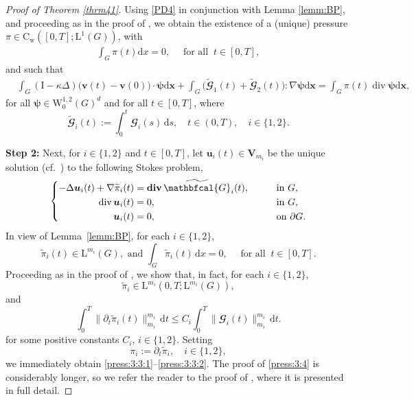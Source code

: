 \documentclass[12pt,reqno]{amsart}
\numberwithin{equation}{section}
\let\originalleft\left
\let\originalright\right
\renewcommand{\left}{\mathopen{}\mathclose\bgroup\originalleft}
\renewcommand{\right}{\aftergroup\egroup\originalright}
\theoremstyle{definition}
\def\d{\mathrm{d}}
\def\ds{\,\mathrm{d}s}
\def\div{\operatorname{div}}
\def\divv{\mathbf{div}\,}
\def\I{\mathrm{I}}
\def\W{\mathrm{W}}
\def\L{\mathrm{L}}
\def\uu{\boldsymbol{u}}  %
\def\vv{\boldsymbol{v}}
\def\C{\mathrm{C}}
\def\x{\boldsymbol{x}}
\def\bfV{\mathbf{V}}
\def\bpsi{\boldsymbol{\psi}}
\def\bcG{\mathbfcal{G}}
\begin{document}
\begin{proof}[Proof of Theorem \ref{thrm41}]
{Using \eqref{PD4} in conjunction with Lemma \ref{lemm:BP}, and proceeding as in the proof of \cite[Theorem 2.6]{Wolf:2007}, we obtain the existence of a (unique) pressure $\pi\in \C_{\mathrm{w}}([0,T];\L^1( G ))$, with
\begin{align}\label{PD5}
	\int_G \pi(t)\d x=0,\quad \text{ for all }\ t\in[0,T],
\end{align}
and such that
\begin{align}\label{PD6}
&	\int_G (\I-\kappa\Delta) \big(\vv(t)-\vv(0)\big)\cdot \bpsi \d \x  + \int_G\big(\widetilde{\bcG}_1(t)+\widetilde{\bcG}_2(t)\big):\nabla \bpsi \d \x =
\int_G \pi(t)\div\bpsi \d \x,
\end{align}
for all $\bpsi \in \W_{0}^{1,2}(G)^d$ and for all $t\in[0,T]$, where
\begin{equation}\label{BcG:i}
\widetilde{\bcG}_i(t):=\int_{0}^{t}\bcG_i(s)\ds,\quad t\in(0,T),\quad i\in\{1,2\}.
\end{equation}

\vspace{2mm}
\noindent
\textbf{Step 2:}
Next, for $i \in \{1,2\}$ and $t \in [0,T]$, let $\uu_i(t) \in \bfV_{m_i}$ be the unique solution (cf.~\cite[Theorem~IV.6.1]{Galdi:2011}) to the following Stokes problem,
\begin{equation}
	\left\{\begin{aligned}
   -\Delta\uu_i(t)+\nabla\widetilde{\pi}_i(t) &= \divv\widetilde{\bcG}_i(t), \qquad &&\text{in } G, \\
   \div\uu_i(t) &= 0, \qquad &&\text{in } G, \\
  \uu_i(t) &= 0, \qquad &&\text{on } \partial G.
\end{aligned}
\right.
\end{equation}
In view of Lemma~\ref{lemm:BP}, for each $i \in \{1,2\}$,
\begin{equation}\label{prop:pi:i}
  \widetilde{\pi}_i(t) \in \L^{m_i}(G), \text{ and }  \int_G \widetilde{\pi}_i(t)\, \mathrm{d}x = 0, \quad \text{ for all }\ t \in [0,T].
\end{equation}
Proceeding as in the proof of \cite[Theorem~2.2]{DRW}, we show that, in fact, for each $i \in \{1,2\}$,
\begin{equation*}
\widetilde{\pi}_i \in \L^{m_i}(0,T; \L^{m_i}(G)),
\end{equation*}
and
\begin{equation*}
\int_{0}^{T} \|\partial_t \widetilde{\pi}_i(t)\|_{m_i}^{m_i} \, \mathrm{d}t \leq C_i \int_{0}^{T} \|\bcG_i(t)\|_{m_i}^{m_i} \, \mathrm{d}t.
\end{equation*}
for some positive constants $C_i$, $i\in\{1,2\}$.
Setting
\begin{equation}\label{der:pi}
  \pi_i := \partial_t \widetilde{\pi}_i, \quad i \in \{1,2\},
\end{equation}
we immediately obtain \eqref{press:3:3:1}--\eqref{press:3:3:2}.
The proof of \eqref{press:3:4} is considerably longer, so we refer the reader to the proof of \cite[Lemma~2.3]{Wolf:2007}, where it is presented in full detail.

}
\end{proof}
\end{document}
